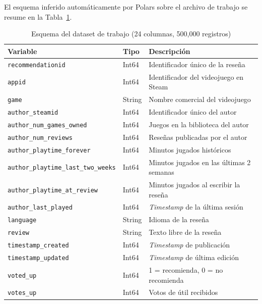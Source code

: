 El esquema inferido automáticamente por Polars sobre el archivo de trabajo se resume en la Tabla~\ref{tab:esquema}.

\begin{table}[H]
\centering
\caption{Esquema del dataset de trabajo (24 columnas, 500,000 registros)}
\label{tab:esquema}
\vspace{0.2cm}
\small
\begin{tabular}{llp{7.2cm}}
\toprule
\textbf{Variable} & \textbf{Tipo} & \textbf{Descripción} \\
\midrule
\texttt{recommendationid}             & Int64   & Identificador único de la reseña \\
\texttt{appid}                        & Int64   & Identificador del videojuego en Steam \\
\texttt{game}                         & String  & Nombre comercial del videojuego \\
\texttt{author\_steamid}              & Int64   & Identificador único del autor \\
\texttt{author\_\bk{}num\_\bk{}games\_\bk{}owned}    & Int64   & Juegos en la biblioteca del autor \\
\texttt{author\_num\_reviews}         & Int64   & Reseñas publicadas por el autor \\
\texttt{author\_\bk{}playtime\_\bk{}forever}    & Int64   & Minutos jugados históricos \\
\texttt{author\_\bk{}playtime\_\bk{}last\_\bk{}two\_\bk{}weeks} & Int64 & Minutos jugados en las últimas 2 semanas \\
\texttt{author\_\bk{}playtime\_\bk{}at\_\bk{}review}  & Int64  & Minutos jugados al escribir la reseña \\
\texttt{author\_last\_played}          & Int64  & \textit{Timestamp} de la última sesión \\
\texttt{language}                      & String & Idioma de la reseña \\
\texttt{review}                        & String & Texto libre de la reseña \\
\texttt{timestamp\_created}            & Int64  & \textit{Timestamp} de publicación \\
\texttt{timestamp\_updated}            & Int64  & \textit{Timestamp} de última edición \\
\texttt{voted\_up}                     & Int64  & 1 = recomienda, 0 = no recomienda \\
\texttt{votes\_up}                     & Int64  & Votos de \guillemotleft{}útil\guillemotright{} recibidos \\

\end{tabular}
\end{table}
